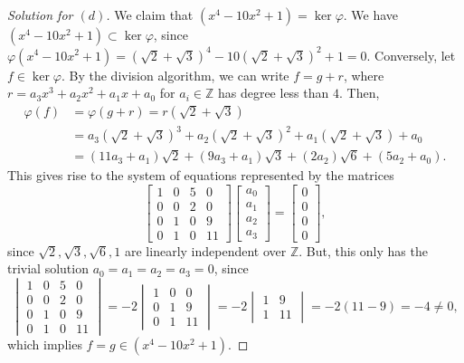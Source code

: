 \documentclass[12pt]{article}
\theoremstyle{remark}
\begin{document}
\begin{proof}[Solution for $(d)$]
  We claim that $(x^4-10x^2+1) = \ker\varphi$. We have $(x^4-10x^2+1) \subset \ker\varphi$, since $\varphi(x^4-10x^2+1) = (\sqrt{2}+\sqrt{3})^4-10(\sqrt{2}+\sqrt{3})^2+1 = 0$. Conversely, let $f \in \ker\varphi$. By the division algorithm, we can write $f = g +r$, where $r = a_3x^3 + a_2x^2 + a_1x + a_0$ for $a_i \in \mathbb{Z}$ has degree less than $4$. Then,
  \begin{align*}
    \varphi(f) &= \varphi(g +r) = r(\sqrt{2}+\sqrt{3})\\
    &= a_3(\sqrt{2}+\sqrt{3})^3 + a_2(\sqrt{2} + \sqrt{3})^2 + a_1(\sqrt{2}+\sqrt{3}) + a_0\\
    &= (11a_3+a_1)\sqrt{2} + (9a_3+a_1)\sqrt{3} + (2a_2)\sqrt{6} + (5a_2+a_0).
  \end{align*}
  This gives rise to the system of equations represented by the matrices
  \begin{equation*}
    \begin{bmatrix}
      1 & 0 & 5 & 0\\
      0 & 0 & 2 & 0\\
      0 & 1 & 0 & 9\\
      0 & 1 & 0 & 11
    \end{bmatrix}
    \begin{bmatrix}
      a_0\\
      a_1\\
      a_2\\
      a_3
    \end{bmatrix}
    =
    \begin{bmatrix}
      0\\
      0\\
      0\\
      0
    \end{bmatrix},
  \end{equation*}
  since $\sqrt{2},\sqrt{3},\sqrt{6},1$ are linearly independent over $\mathbb{Z}$. But, this only has the trivial solution $a_0=a_1=a_2=a_3=0$, since
  \begin{equation*}
    \begin{vmatrix}
      1 & 0 & 5 & 0\\
      0 & 0 & 2 & 0\\
      0 & 1 & 0 & 9\\
      0 & 1 & 0 & 11
    \end{vmatrix} = -2 \begin{vmatrix}
      1 & 0 & 0\\
      0 & 1 & 9\\
      0 & 1 & 11
    \end{vmatrix} = -2 \begin{vmatrix}
      1 & 9\\
      1 & 11
    \end{vmatrix} = -2(11 - 9) = -4 \ne 0,
  \end{equation*}
  which implies $f = g \in (x^4-10x^2+1)$.
\end{proof}
\end{document}
